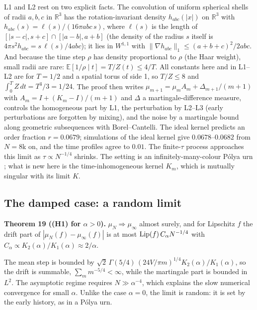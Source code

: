 L1 and L2 rest on two explicit facts. The convolution of
uniform spherical shells of radii \(a,b,c\) in
\(\mathbb R^3\) has the rotation-invariant density
\(h_{abc}(|x|)\) on \(\mathbb R^3\) with
\(h_{abc}(s)=\ell(s)/(16\pi abc\,s)\), where \(\ell(s)\) is
the length of \([|s-c|,s+c]\cap[|a-b|,a+b]\) (the density of
the radius \(s\) itself is
\(4\pi s^2h_{abc}=s\,\ell(s)/4abc\)); it lies in \(W^{1,1}\)
with \(\|\nabla h_{abc}\|_1\le(a+b+c)^2/2abc\). And because
the time step \(\rho\) has density proportional to \(\rho\)
(the Haar weight), small radii are rare:
\(\mathbb E[1/\rho\mid t]=T/Z(t)\le4/T\). All constants here
and in L1--L2 are for \(T=1/2\) and a spatial torus of side
1, so \(T/Z\le8\) and \(\int_0^TZ\,dt=T^3/3=1/24\). The
proof then writes \(\mu_{m+1}=\mu_mA_m+\Delta_{m+1}/(m+1)\)
with \(A_m=I+(K_m-I)/(m+1)\) and \(\Delta\) a
martingale-difference measure, controls the homogeneous part
by L1, the perturbation by L2--L3 (early perturbations are
forgotten by mixing), and the noise by a martingale bound
along geometric subsequences with Borel--Cantelli. The ideal
kernel predicts an order fraction \(r=0.0679\); simulations
of the ideal kernel give \(0.0678\)--\(0.0682\) from
\(N=8\)k on, and the time profiles agree to \(0.01\). The
finite-\(\tau\) process approaches this limit as
\(\tau\propto N^{-1/4}\) shrinks. The setting is an
infinitely-many-colour Pólya urn \cite{MM17, MV20}; what is
new here is the time-inhomogeneous kernel \(K_m\), which is
mutually singular with its limit \(K\).

\hypertarget{the-damped-case-a-random-limit}{%
\subsection{The damped case: a random
limit}\label{the-damped-case-a-random-limit}}

\textbf{Theorem 19 ((H1) for \(\alpha>0\)).}
\(\mu_N\Rightarrow\mu_\infty\) almost surely, and for
Lipschitz \(f\) the drift part of
\(|\mu_N(f)-\mu_\infty(f)|\) is at most
\({\rm Lip}(f)\,C_\alpha N^{-1/4}\) with
\(C_\alpha\propto K_2(\alpha)/K_1(\alpha)\approx2/\alpha\).

The mean step is bounded by
\(\sqrt2\,\Gamma(5/4)\,(24V/\pi m)^{1/4}K_2(\alpha)/K_1(\alpha)\),
so the drift is summable, \(\sum_mm^{-5/4}<\infty\), while
the martingale part is bounded in \(L^2\). The asymptotic
regime requires \(N\gg\alpha^{-4}\), which explains the slow
numerical convergence for small \(\alpha\). Unlike the case
\(\alpha=0\), the limit is random: it is set by the early
history, as in a Pólya urn.

